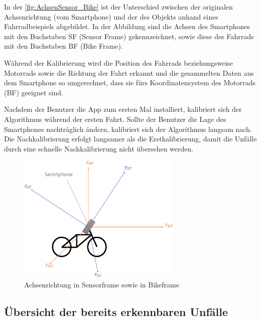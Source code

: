 In der \autoref{fig:AchsenSensor_Bike} ist der Unterschied zwischen der originalen Achsenrichtung (vom Smartphone) und der des Objekts anhand eines Fahrradbeispiels abgebildet. In der Abbildung sind die Achsen des Smartphones mit den Buchstaben \glqq SF\grqq{} (Sensor Frame) gekennzeichnet, sowie diese des Fahrrads mit den Buchstaben \glqq BF\grqq{} (Bike Frame).

Während der Kalibrierung wird die Position des Fahrrads beziehungsweise Motorrads sowie die Richtung der Fahrt erkannt und die gesammelten Daten aus dem Smartphone so umgerechnet, dass sie fürs Koordinatensystem des Motorrads (BF) geeignet sind.

Nachdem der Benutzer die App zum ersten Mal installiert, kalibriert sich der Algorithmus während der ersten Fahrt. Sollte der Benutzer die Lage des Smartphones nachträglich ändern, kalibriert sich der Algorithmus langsam nach. Die Nachkalibrierung erfolgt langsamer als die Erstkalibrierung, damit die Unfälle durch eine schnelle Nachkalibrierung nicht übersehen werden.



\begin{figure}
	\centering
	\includegraphics[width=0.7\textwidth]{Bilder/AchsenSensor_Bike_new_.pdf} 
	\caption{Achsenrichtung in Sensorframe sowie in Bikeframe}
	\label{fig:AchsenSensor_Bike}
\end{figure}



\subsection{Übersicht der bereits erkennbaren Unfälle}

%


